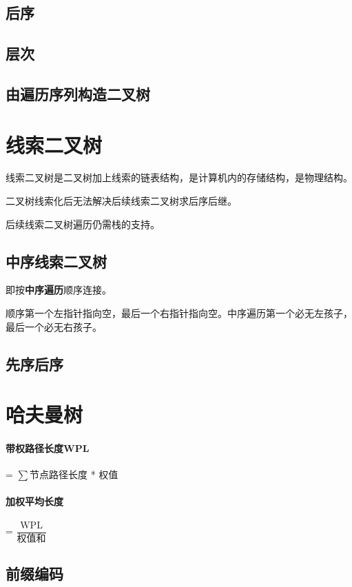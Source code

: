 \subsection{后序}

\subsection{层次}

\subsection{由遍历序列构造二叉树}


\section{线索二叉树}

线索二叉树是二叉树加上线索的链表结构，是计算机内的存储结构，是物理结构。

二叉树线索化后无法解决后续线索二叉树求后序后继。

后续线索二叉树遍历仍需栈的支持。

\subsection{中序线索二叉树}
即按\textbf{中序遍历}顺序连接。

顺序第一个左指针指向空，最后一个右指针指向空。中序遍历第一个必无左孩子，最后一个必无右孩子。


\subsection{先序后序}


\section{哈夫曼树}

\paragraph{带权路径长度WPL}
 = \(\sum\)节点路径长度 * 权值

\paragraph{加权平均长度}
 = \(\dfrac{\text{WPL}}{\text{权值和}}\)

\subsection{前缀编码}

